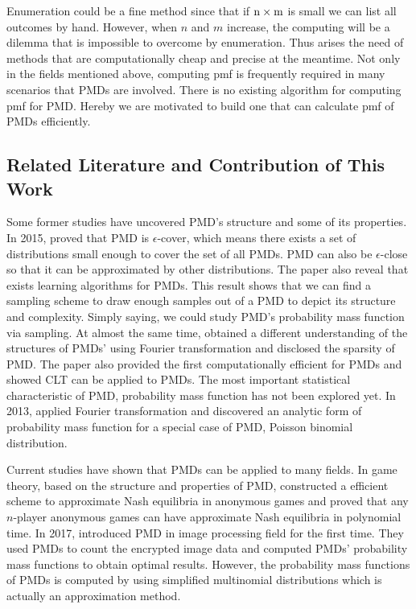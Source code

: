 \documentclass[12pt]{article}
\newcommand{\PMD}{\textrm{PMD}}
\begin{document}
Enumeration could be a fine method since that if $\rm n \times m$ is small we can list all outcomes by hand. However, when $n$ and $m$ increase, the computing will be a dilemma that is impossible to overcome by enumeration. Thus arises the need of methods that are computationally cheap and precise at the meantime. Not only in the fields mentioned above, computing pmf is frequently required in many scenarios that $\PMD$s are involved. There is no existing algorithm for computing pmf for PMD. Hereby we are motivated to build one that can calculate pmf of $\PMD$s efficiently.



\subsection{Related Literature and Contribution of This Work}


Some former studies have uncovered $\PMD$'s structure and some of its properties. In 2015,  proved that $\PMD$ is $\epsilon$-cover, which means there exists a set of distributions small enough to cover the set of all $\PMD$s. $\PMD$ can also be $\epsilon$-close so that it can be approximated by other distributions. The paper also reveal that exists learning algorithms for $\PMD$s. This result shows that we can find a sampling scheme to draw enough samples out of a $\PMD$ to depict its structure and complexity. Simply saying, we could study $\PMD$'s probability mass function via sampling. At almost the same time,  obtained a different understanding of the structures of $\PMD$s' using Fourier transformation and disclosed the sparsity of $\PMD$. The paper also provided the first computationally efficient for $\PMD$s and showed CLT can be applied to $\PMD$s. The most important statistical characteristic of $\PMD$, probability mass function has not been explored yet. In 2013,  applied Fourier transformation and discovered an analytic form of probability mass function for a special case of $\PMD$, Poisson binomial distribution.

Current studies have shown that $\PMD$s can be applied to many fields. In game theory, based on the structure and properties of $\PMD$,  constructed a efficient scheme to approximate Nash equilibria in anonymous games and  proved that any $n$-player anonymous games can have approximate Nash equilibria in polynomial time. In 2017,  introduced $\PMD$ in image processing field for the first time. They used $\PMD$s to count the encrypted image data and computed $\PMD$s' probability mass functions to obtain optimal results. However, the probability mass functions of $\PMD$s is computed by using simplified multinomial distributions which is actually an approximation method.
\end{document}
